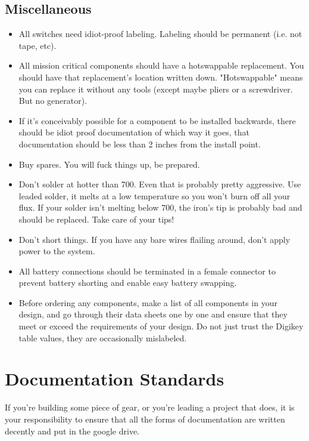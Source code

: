 \documentclass{article}
\begin{document}

\subsection{Miscellaneous}
\begin{itemize}
\item All switches need idiot-proof labeling. Labeling should be permanent (i.e. not tape, etc).
\item All mission critical components should have a hotswappable replacement. You should have that replacement's location written down. "Hotswappable" means you can replace it without any tools (except maybe pliers or a screwdriver. But no generator).
\item If it's conceivably possible for a component to be installed backwards, there should be idiot proof documentation of which way it goes, that documentation should be less than 2 inches from the install point.
\item Buy spares. You will fuck things up, be prepared.
\item Don't solder at hotter than 700\degree. Even that is probably pretty aggressive. Use leaded solder, it melts at a low temperature so you won't burn off all your flux. If your solder isn't melting below 700\degree, the iron's tip is probably bad and should be replaced. Take care of your tips!
\item Don't short things. If you have any bare wires flailing around, don't apply power to the system.
\item All battery connections should be terminated in a female connector to prevent battery shorting and enable easy battery swapping.
\item Before ordering any components, make a list of all components in your design, and go through their data sheets one by one and ensure that they meet or exceed the requirements of your design. Do not just trust the Digikey table values, they are occasionally mislabeled.
\end{itemize}

\section{Documentation Standards}
If you're building some piece of gear, or you're leading a project that does, it is your responsibility to ensure that all the forms of documentation are written decently and put in the google drive.
\end{document}
